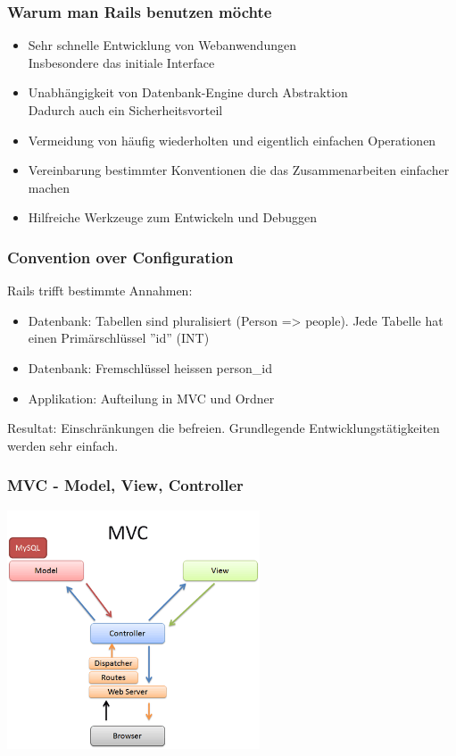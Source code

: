\begin{frame}
  \frametitle{Warum man Rails benutzen möchte}
  \begin{itemize}
    \item{Sehr schnelle Entwicklung von Webanwendungen \\ Insbesondere das initiale Interface}
    \item{Unabhängigkeit von Datenbank-Engine durch Abstraktion \\ Dadurch auch ein Sicherheitsvorteil}
    \item{Vermeidung von häufig wiederholten und eigentlich einfachen Operationen}
    \item{Vereinbarung bestimmter Konventionen die das Zusammenarbeiten einfacher machen}
    \item{Hilfreiche Werkzeuge zum Entwickeln und Debuggen}
  \end{itemize}
\end{frame}

\begin{frame}
  \frametitle{Convention over Configuration}
  Rails trifft bestimmte Annahmen:
  \vspace{0.5cm}
  \begin{itemize}
    \item Datenbank: Tabellen sind pluralisiert (Person => people). Jede Tabelle hat einen Primärschlüssel ''id'' (INT)
    \item Datenbank: Fremschlüssel heissen person\_id
    \item Applikation: Aufteilung in MVC und Ordner
  \end{itemize}
  \vspace{0.5cm}
  Resultat: Einschränkungen die befreien. Grundlegende Entwicklungstätigkeiten werden sehr einfach.
\end{frame}

\begin{frame}
  \frametitle{MVC - Model, View, Controller}
  \begin{center}
    \includegraphics[width=7.5cm]{img/mvc.png}
  \end{center}
\end{frame}

